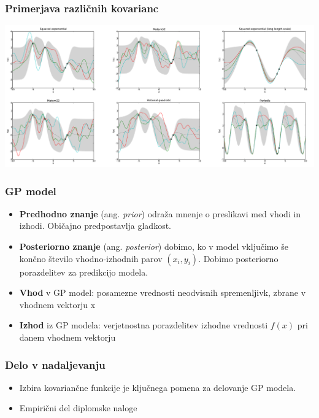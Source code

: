 \documentclass{beamer}
\begin{document}
\begin{frame}

\frametitle{Primerjava različnih kovarianc}
\includegraphics[scale=0.35]{kovariance}

\end{frame}
\begin{frame}

\frametitle{GP model}

\begin{itemize}
\item \textbf{Predhodno znanje} (ang. \textit{prior}) odraža mnenje o preslikavi med vhodi in izhodi. Običajno predpostavlja gladkost.
\item \textbf{Posteriorno znanje} (ang. \textit{posterior}) dobimo, ko v model vključimo še končno število vhodno-izhodnih parov $(x_i, y_i)$.
Dobimo posteriorno porazdelitev za predikcijo modela. 
\item \textbf{Vhod} v GP model: posamezne vrednosti neodvisnih spremenljivk, zbrane v vhodnem vektorju x
\item \textbf{Izhod} iz GP modela: verjetnostna porazdelitev izhodne vrednosti $ f(x)$ pri danem vhodnem vektorju
\end{itemize}

\end{frame}


\begin{frame}

\frametitle{Delo v nadaljevanju}
\begin{itemize}

\item Izbira kovariančne funkcije je ključnega pomena za delovanje GP modela.
\item Empirični del diplomske naloge

\end{itemize}


\end{frame}
\end{document}
